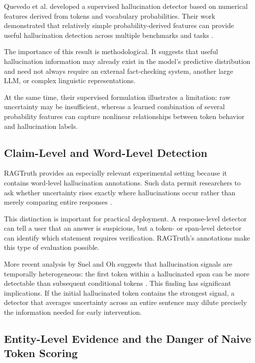 \documentclass[11pt]{article}
\begin{document}
Quevedo et al. developed a supervised hallucination detector based on numerical features derived from tokens and vocabulary probabilities. Their work demonstrated that relatively simple probability-derived features can provide useful hallucination detection across multiple benchmarks and tasks \cite{quevedo2025}.

The importance of this result is methodological. It suggests that useful hallucination information may already exist in the model's predictive distribution and need not always require an external fact-checking system, another large LLM, or complex linguistic representations.

At the same time, their supervised formulation illustrates a limitation: raw uncertainty may be insufficient, whereas a learned combination of several probability features can capture nonlinear relationships between token behavior and hallucination labels.

\subsection{Claim-Level and Word-Level Detection}
\label{sec:claim-word}

RAGTruth provides an especially relevant experimental setting because it contains word-level hallucination annotations. Such data permit researchers to ask whether uncertainty rises exactly where hallucinations occur rather than merely comparing entire responses \cite{niu2024}.

This distinction is important for practical deployment. A response-level detector can tell a user that an answer is suspicious, but a token- or span-level detector can identify which statement requires verification. RAGTruth's annotations make this type of evaluation possible.

More recent analysis by Snel and Oh suggests that hallucination signals are temporally heterogeneous: the first token within a hallucinated span can be more detectable than subsequent conditional tokens \cite{snel2025}. This finding has significant implications. If the initial hallucinated token contains the strongest signal, a detector that averages uncertainty across an entire sentence may dilute precisely the information needed for early intervention.

\subsection{Entity-Level Evidence and the Danger of Naive Token Scoring}
\label{sec:entity-level}
\end{document}
